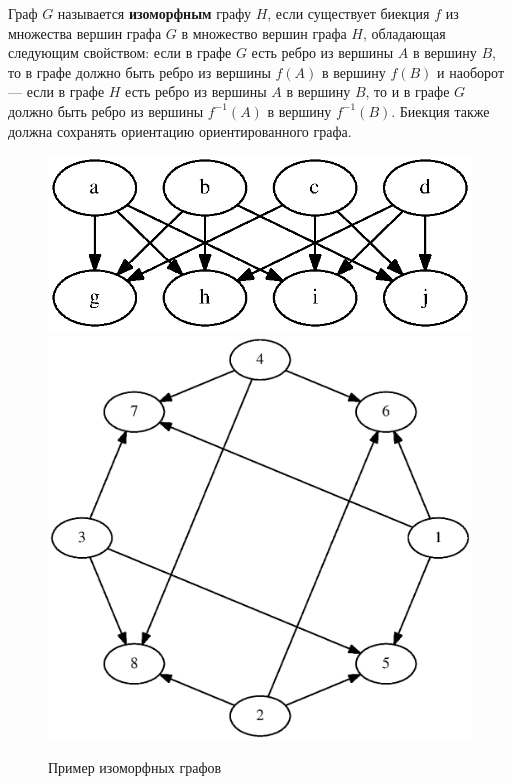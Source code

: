 \documentclass[russian,utf8,emptystyle]{eskdtext}
\begin{document}
\begin{spacing}{1.5}
Граф $G$ называется \textbf{изоморфным} графу $H$, если существует биекция $f$ из множества вершин графа $G$ в множество вершин графа $H$, обладающая следующим свойством: если в графе $G$ есть ребро из вершины $A$ в вершину $B$, то в графе должно быть ребро из вершины $f(A)$ в вершину $f(B)$ и наоборот --- если в графе $H$ есть ребро из вершины $A$ в вершину $B$, то и в графе $G$ должно быть ребро из вершины $f^{-1}(A)$ в вершину $f^{-1}(B)$. Биекция также должна сохранять ориентацию ориентированного графа.

\begin{figure}[h!]
\centering
\includegraphics[scale=0.6]{graphs_isomorph_example_1}
\includegraphics[scale=0.6]{graphs_isomorph_example_2}
\caption{Пример изоморфных графов}
\label{fig:graphs_isomorph_example}
\end{figure}


\end{spacing}
\end{document}
